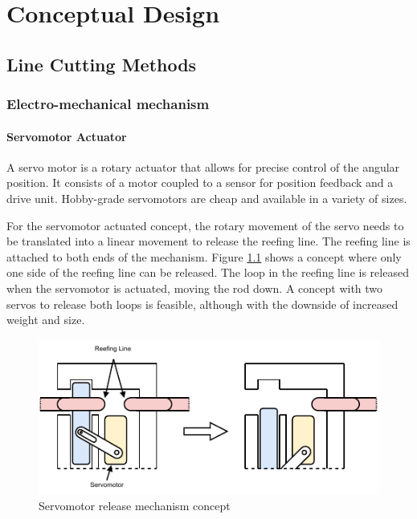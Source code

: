 \chapter{Conceptual Design}

\section{Line Cutting Methods}

\subsection{Electro-mechanical mechanism}
\subsubsection{Servomotor Actuator}\label{servo-actuator}
A servo motor is a rotary actuator that allows for precise control of the angular position. It consists of a motor coupled to a sensor for position feedback and a drive unit. Hobby-grade servomotors are cheap and available in a variety of sizes.\cite{servo-motor}

For the servomotor actuated concept, the rotary movement of the servo needs to be translated into a linear movement to release the reefing line. The reefing line is attached to both ends of the mechanism. Figure \ref{fig:servo} shows a concept where only one side of the reefing line can be released. The loop in the reefing line is released when the servomotor is actuated, moving the rod down. A concept with two servos to release both loops is feasible, although with the downside of increased weight and size. 

\begin{figure}[h!]
	\centering
	\includegraphics[width=\textwidth]{images/servo}
	\caption{Servomotor release mechanism concept}
	\label{fig:servo}
\end{figure}


